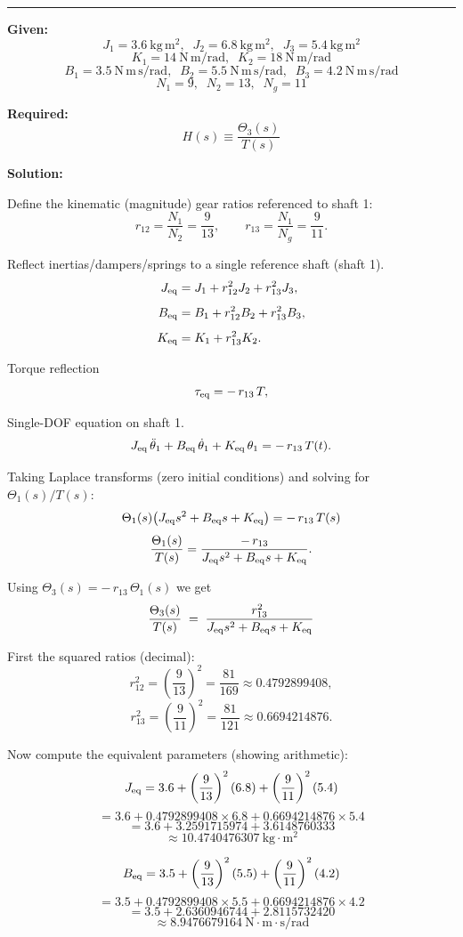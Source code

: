 \noindent\rule{\textwidth}{1pt}
\textbf{Given:}
\[
J_1 = 3.6~\mathrm{kg\,m^2},\;\; J_2 = 6.8~\mathrm{kg\,m^2},\;\; J_3 = 5.4~\mathrm{kg\,m^2}
\]
\[
K_1 = 14~\mathrm{N\,m/rad},\;\; K_2 = 18~\mathrm{N\,m/rad}
\]
\[
B_1 = 3.5~\mathrm{N\,m\,s/rad},\;\; B_2 = 5.5~\mathrm{N\,m\,s/rad},\;\; B_3 = 4.2~\mathrm{N\,m\,s/rad}
\]
\[
N_1 = 9,\;\; N_2 = 13,\;\; N_g = 11
\]

\textbf{Required:}
\[
H(s) \equiv \dfrac{\Theta_3(s)}{T(s)}
\]

\textbf{Solution:}

Define the kinematic (magnitude) gear ratios referenced to shaft 1:
\[
r_{12}=\frac{N_1}{N_2}=\frac{9}{13},\qquad
r_{13}=\frac{N_1}{N_g}=\frac{9}{11}.
\]

Reflect inertias/dampers/springs to a single reference shaft (shaft 1).
\[
\begin{aligned}
J_{\rm eq} &= J_1 + r_{12}^2 J_2 + r_{13}^2 J_3,\\[4pt]
B_{\rm eq} &= B_1 + r_{12}^2 B_2 + r_{13}^2 B_3,\\[4pt]
K_{\rm eq} &= K_1 + r_{13}^2 K_2.
\end{aligned}
\]

Torque reflection
\[
\tau_{\rm eq} = -\,r_{13}\,T,
\]

Single-DOF equation on shaft 1.
\[
J_{\rm eq}\,\ddot\theta_1 + B_{\rm eq}\,\dot\theta_1 + K_{\rm eq}\,\theta_1 = -\,r_{13}\,T(t).
\]

Taking Laplace transforms (zero initial conditions) and solving for \(\Theta_1(s)/T(s)\):
\[
\Theta_1(s)\big( J_{\rm eq}s^2 + B_{\rm eq}s + K_{\rm eq}\big)
= -\,r_{13}\,T(s)
\]
\[
\frac{\Theta_1(s)}{T(s)} = \frac{-\,r_{13}}{J_{\rm eq}s^2 + B_{\rm eq}s + K_{\rm eq}}.
\]

Using \(\Theta_3(s) = -\,r_{13}\,\Theta_1(s)\) we get
\[
\frac{\Theta_3(s)}{T(s)} \;=\; \frac{r_{13}^2}{J_{\rm eq}s^2 + B_{\rm eq}s + K_{\rm eq}}
\]

First the squared ratios (decimal):
\[
r_{12}^2=\left(\frac{9}{13}\right)^2=\frac{81}{169}\approx 0.4792899408,
\]
\[
r_{13}^2=\left(\frac{9}{11}\right)^2=\frac{81}{121}\approx 0.6694214876.
\]

Now compute the equivalent parameters (showing arithmetic):
\[
J_{\rm eq} = 3.6 + \left(\frac{9}{13}\right)^2 (6.8) + \left(\frac{9}{11}\right)^2 (5.4)
\]
\[
= 3.6 + 0.4792899408 \times 6.8 + 0.6694214876 \times 5.4
\]
\[
= 3.6 + 3.2591715974 + 3.6148760333
\]
\[
\approx 10.4740476307\ \mathrm{kg\cdot m^2}
\]

\[
B_{\rm eq} = 3.5 + \left(\frac{9}{13}\right)^2 (5.5) + \left(\frac{9}{11}\right)^2 (4.2)
\]
\[
= 3.5 + 0.4792899408 \times 5.5 + 0.6694214876 \times 4.2
\]
\[
= 3.5 + 2.6360946744 + 2.8115732420
\]
\[
\approx 8.9476679164\ \mathrm{N\cdot m\cdot s/rad}
\]


